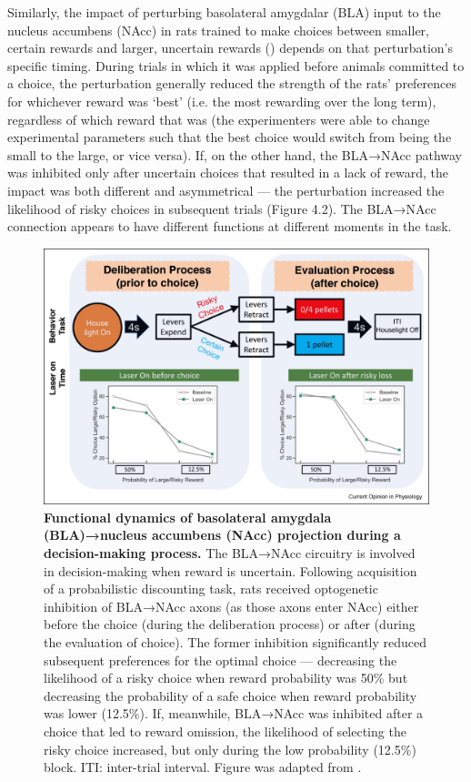 \begin{refsection}
Similarly, the impact of perturbing basolateral amygdalar (BLA) input to the nucleus accumbens (NAcc) in rats trained to make choices between smaller, certain rewards and larger, uncertain rewards (\cite{bercovici2018a}) depends on that perturbation’s specific timing. During trials in which it was applied before animals committed to a choice, the perturbation generally reduced the strength of the rats’ preferences for whichever reward was ‘best’ (i.e. the most rewarding over the long term), regardless of which reward that was (the experimenters were able to change experimental parameters such that the best choice would switch from being the small to the large, or vice versa). If, on the other hand, the BLA→NAcc pathway was inhibited only after uncertain choices that resulted in a lack of reward, the impact was both different and asymmetrical — the perturbation increased the likelihood of risky choices in subsequent trials (Figure 4.2). The BLA→NAcc connection appears to have different functions at different moments in the task.

\begin{figure}
\includegraphics[width=\linewidth]{lin_2021_review_figs/1-s2.0-S2468867320301693-gr2_lrg.jpg}
\caption{\textbf{Functional dynamics of basolateral amygdala (BLA)→nucleus accumbens (NAcc) projection during a decision-making process.} The BLA→NAcc circuitry is involved in decision-making when reward is uncertain. Following acquisition of a probabilistic discounting task, rats received optogenetic inhibition of BLA→NAcc axons (as those axons enter NAcc) either before the choice (during the deliberation process) or after (during the evaluation of choice). The former inhibition significantly reduced subsequent preferences for the optimal choice — decreasing the likelihood of a risky choice when reward probability was 50\% but decreasing the probability of a safe choice when reward probability was lower (12.5\%). If, meanwhile, BLA→NAcc was inhibited after a choice that led to reward omission, the likelihood of selecting the risky choice increased, but only during the low probability (12.5\%) block. ITI: inter-trial interval. Figure was adapted from \cite{bercovici2018a}.}
\label{fig:wrapfig}
\end{figure}


\end{refsection}
